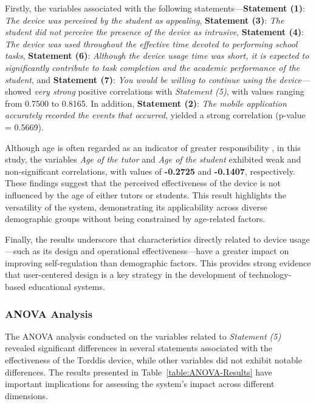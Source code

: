                 Firstly, the variables associated with the following statements—\textbf{Statement (1)}: \textit{The device was perceived by the student as appealing}, \textbf{Statement (3)}: \textit{The student did not perceive the presence of the device as intrusive}, \textbf{Statement (4)}: \textit{The device was used throughout the effective time devoted to performing school tasks}, \textbf{Statement (6)}: \textit{Although the device usage time was short, it is expected to significantly contribute to task completion and the academic performance of the student}, and \textbf{Statement (7)}: \textit{You would be willing to continue using the device}—showed \textit{very strong} positive correlations with \textit{Statement (5)}, with values ranging from 0.7500 to 0.8165. In addition, \textbf{Statement (2)}: \textit{The mobile application accurately recorded the events that occurred}, yielded a strong correlation (p-value = 0.5669).
                
                Although age is often regarded as an indicator of greater responsibility \citep{Moss2018Why}, in this study, the variables \textit{Age of the tutor} and \textit{Age of the student} exhibited weak and non-significant correlations, with values of \textbf{-0.2725} and \textbf{-0.1407}, respectively. These findings suggest that the perceived effectiveness of the device is not influenced by the age of either tutors or students. This result highlights the versatility of the system, demonstrating its applicability across diverse demographic groups without being constrained by age-related factors.
                
                Finally, the results underscore that characteristics directly related to device usage—such as its design and operational effectiveness—have a greater impact on improving self-regulation than demographic factors. This provides strong evidence that user-centered design is a key strategy in the development of technology-based educational systems.
                
                \subsubsection{ANOVA Analysis}
                The ANOVA analysis conducted on the variables related to \textit{Statement (5)} revealed significant differences in several statements associated with the effectiveness of the Torddis device, while other variables did not exhibit notable differences. The results presented in Table~\ref{table:ANOVA-Results} have important implications for assessing the system's impact across different dimensions.
                

